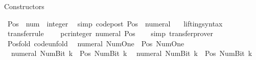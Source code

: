 \begin{isabellebody}
%
\isamarkuptrue%
%
\endisatagdocument
{\isafolddocument}%
%
\isadelimdocument
%
\endisadelimdocument
%
\begin{isamarkuptext}%
Constructors%
\end{isamarkuptext}\isamarkuptrue%
\isamarkupfalse%
\ Pos\ {\isacharcolon}{\kern0pt}{\isacharcolon}{\kern0pt}\ {\isachardoublequoteopen}num\ {\isasymRightarrow}\ integer{\isachardoublequoteclose}\isanewline
{}\isanewline
\ \ {\isacharbrackleft}{\kern0pt}simp{\isacharcomma}{\kern0pt}\ code{\isacharunderscore}{\kern0pt}post{\isacharbrackright}{\kern0pt}{\isacharcolon}{\kern0pt}\ {\isachardoublequoteopen}Pos\ {\isacharequal}{\kern0pt}\ numeral{\isachardoublequoteclose}\isanewline
\isanewline
{}\isamarkupfalse%
\isanewline
\ \ \ lifting{\isacharunderscore}{\kern0pt}syntax\isanewline
{}\isanewline
\isanewline
{}\isamarkupfalse%
\ {\isacharbrackleft}{\kern0pt}transfer{\isacharunderscore}{\kern0pt}rule{\isacharbrackright}{\kern0pt}{\isacharcolon}{\kern0pt}\isanewline
\ \ {\isacartoucheopen}{\isacharparenleft}{\kern0pt}{\isacharparenleft}{\kern0pt}{\isacharequal}{\kern0pt}{\isacharparenright}{\kern0pt}\ {\isacharequal}{\kern0pt}{\isacharequal}{\kern0pt}{\isacharequal}{\kern0pt}{\isachargreater}{\kern0pt}\ pcr{\isacharunderscore}{\kern0pt}integer{\isacharparenright}{\kern0pt}\ numeral\ Pos{\isacartoucheclose}\isanewline
%
\isadelimproof
\ \ %
\endisadelimproof
%
\isatagproof
{}\isamarkupfalse%
\ simp\ transfer{\isacharunderscore}{\kern0pt}prover%
\endisatagproof
{\isafoldproof}%
%
\isadelimproof
\isanewline
%
\endisadelimproof
\isanewline
{}\isamarkupfalse%
\isanewline
\isanewline
{}\isamarkupfalse%
\ Pos{\isacharunderscore}{\kern0pt}fold\ {\isacharbrackleft}{\kern0pt}code{\isacharunderscore}{\kern0pt}unfold{\isacharbrackright}{\kern0pt}{\isacharcolon}{\kern0pt}\isanewline
\ \ {\isachardoublequoteopen}numeral\ Num{\isachardot}{\kern0pt}One\ {\isacharequal}{\kern0pt}\ Pos\ Num{\isachardot}{\kern0pt}One{\isachardoublequoteclose}\isanewline
\ \ {\isachardoublequoteopen}numeral\ {\isacharparenleft}{\kern0pt}Num{\isachardot}{\kern0pt}Bit{}\ k{\isacharparenright}{\kern0pt}\ {\isacharequal}{\kern0pt}\ Pos\ {\isacharparenleft}{\kern0pt}Num{\isachardot}{\kern0pt}Bit{}\ k{\isacharparenright}{\kern0pt}{\isachardoublequoteclose}\isanewline
\ \ {\isachardoublequoteopen}numeral\ {\isacharparenleft}{\kern0pt}Num{\isachardot}{\kern0pt}Bit{}\ k{\isacharparenright}{\kern0pt}\ {\isacharequal}{\kern0pt}\ Pos\ {\isacharparenleft}{\kern0pt}Num{\isachardot}{\kern0pt}Bit{}\ k{\isacharparenright}{\kern0pt}{\isachardoublequoteclose}\isanewline

\end{isabellebody}
